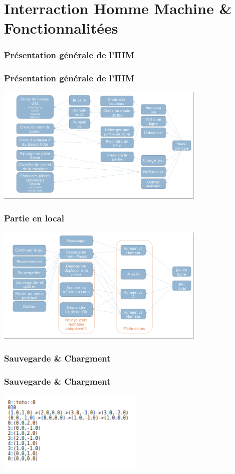 \documentclass{beamer}
\begin{document}
\section{Interraction Homme Machine \& Fonctionnalit\'ees}%
\begin{frame}
\end{frame}\begin{frame}
    \frametitle{Pr\'esentation g\'en\'erale de l'IHM}
\end{frame}
    \begin{frame}
        \frametitle{Pr\'esentation g\'en\'erale de l'IHM}
        \includegraphics[width=10cm]{general.png}
    \end{frame}
    \begin{frame}
        \frametitle{Partie en local}
        \includegraphics[width=10cm]{deroulementPartie.png}
    \end{frame}
    \begin{frame}
      \frametitle{Sauvegarde \& Chargment}
    \end{frame}
    \begin{frame}
      \frametitle{Sauvegarde \& Chargment}
      \includegraphics[width=7cm]{./charge.png}
    \end{frame}
\end{document}
